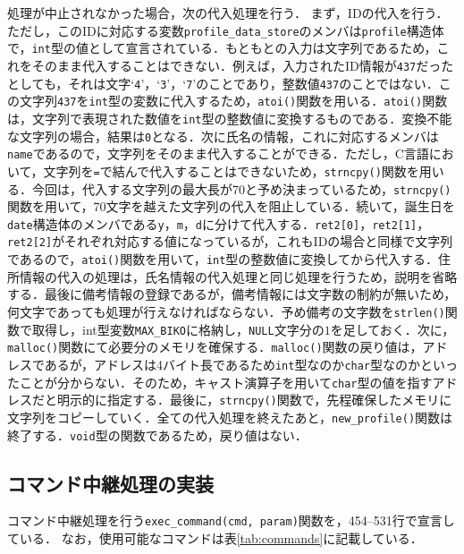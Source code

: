 処理が中止されなかった場合，次の代入処理を行う．
まず，IDの代入を行う．ただし，このIDに対応する変数\verb|profile_data_store|のメンバは\verb|profile|構造体で，\verb|int|型の値として宣言されている．もともとの入力は文字列であるため，これをそのまま代入することはできない．例えば，入力されたID情報が\verb|437|だったとしても，それは文字‘\verb|4|’，‘\verb|3|’，‘\verb|7|’のことであり，整数値\verb|437|のことではない．この文字列\verb|437|を\verb|int|型の変数に代入するため，\verb|atoi()|関数を用いる．\verb|atoi()|関数は，文字列で表現された数値を\verb|int|型の整数値に変換するものである．変換不能な文字列の場合，結果は\verb|0|となる\cite{www:label6}．次に氏名の情報，これに対応するメンバは\verb|name|であるので，文字列をそのまま代入することができる．ただし，C言語において，文字列を\verb|=|で結んで代入することはできないため，\verb|strncpy()|関数を用いる．今回は，代入する文字列の最大長が70と予め決まっているため，\verb|strncpy()|関数を用いて，70文字を越えた文字列の代入を阻止している\cite{www:label5}．続いて，誕生日を\verb|date|構造体のメンバである\verb|y|，\verb|m|，\verb|d|に分けて代入する．\verb|ret2[0]|，\verb|ret2[1]|，\verb|ret2[2]|がそれぞれ対応する値になっているが，これもIDの場合と同様で文字列であるので，\verb|atoi()|関数を用いて，\verb|int|型の整数値に変換してから代入する．住所情報の代入の処理は，氏名情報の代入処理と同じ処理を行うため，説明を省略する．最後に備考情報の登録であるが，備考情報には文字数の制約が無いため，何文字であっても処理が行えなければならない．予め備考の文字数を\verb|strlen()|関数で取得し，int型変数\verb|MAX_BIKO|に格納し，\verb|NULL|文字分の$1$を足しておく\cite{www:label8}．次に，\verb|malloc()|関数にて必要分のメモリを確保する\cite{www:label9}．\verb|malloc()|関数の戻り値は，アドレスであるが，アドレスは4バイト長であるため\verb|int|型なのか\verb|char|型なのかといったことが分からない．そのため，キャスト演算子を用いて\verb|char|型の値を指すアドレスだと明示的に指定する\cite{www:label10}．最後に，\verb|strncpy()|関数で，先程確保したメモリに文字列をコピーしていく．全ての代入処理を終えたあと，\verb|new_profile()|関数は終了する．\verb|void|型の関数であるため，戻り値はない．

\subsection{コマンド中継処理の実装}

コマンド中継処理を行う\verb|exec_command(cmd, param)|関数を，454--531行で宣言している．
なお，使用可能なコマンドは表\ref{tab:commands}に記載している．

